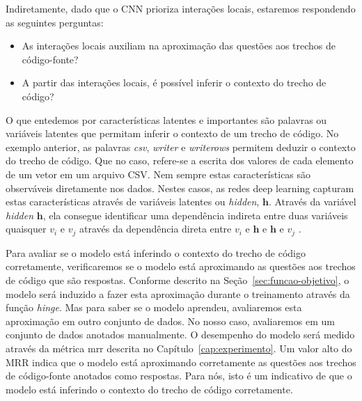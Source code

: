 Indiretamente, dado que o CNN prioriza interações locais, estaremos respondendo as seguintes perguntas:
\begin{itemize}
    
        \item As interações locais auxiliam na aproximação das questões aos trechos de código-fonte?
        \item A partir das interações locais, é possível inferir o contexto do trecho de código?
\end{itemize}



O que entedemos por características latentes e importantes são palavras ou variáveis latentes que permitam inferir o contexto de um trecho de código. No exemplo anterior, as palavras \emph{csv}, \emph{writer} e \emph{writerows} permitem deduzir o contexto do trecho de código. Que no caso, refere-se a escrita dos valores de cada elemento de um vetor em um arquivo CSV. Nem sempre estas características são observáveis diretamente nos dados. Nestes casos, as redes deep learning capturam estas características através de variáveis latentes ou \textit{hidden}, $\bm{h}$. Através da variável \textit{hidden} $\bm{h}$, ela consegue identificar uma dependência indireta entre duas variáveis quaisquer $v_{i}$ e $v_{j}$ através da dependência direta entre $v_{i}$ e $\bm{h}$ e $\bm{h}$ e $v_{j}$ \citep{Goodfellow-et-al-2016}.

Para avaliar se o modelo está inferindo o contexto do trecho de código corretamente, verificaremos se o modelo está aproximando as questões aos trechos de código que são respostas. Conforme descrito na Seção~\ref{sec:funcao-objetivo}, o modelo será induzido a fazer esta aproximação durante o treinamento através da função \textit{hinge}. Mas para saber se o modelo aprendeu, avaliaremos esta aproximação em outro conjunto de dados. No nosso caso, avaliaremos em um conjunto de dados anotados manualmente. O desempenho do modelo será medido através da métrica \acrshort{mrr} descrita no Capítulo~\ref{cap:experimento}. Um valor alto do MRR indica que o modelo está aproximando corretamente as questões aos trechos de código-fonte anotados como respostas. Para nós, isto é um indicativo de que o modelo está inferindo o contexto do trecho de código corretamente.
